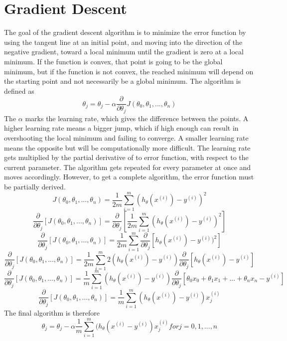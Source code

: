 \documentclass[a4paper,12pt]{article}
\begin{document}
\section{Gradient Descent}
The goal of the gradient descent algorithm is to minimize the error function by using the tangent line at an initial point, and moving into the direction of the negative gradient, toward a local minimum until the gradient is zero at a local minimum. If the function is convex, that point is going to be the global minimum, but if the function is not convex, the reached minimum will depend on the starting point and not necessarily be a global minimum. The algorithm is defined as \[\theta_j = \theta_j - \alpha \frac{\partial}{\partial\theta_j} J(\theta_0, \theta_1, ..., \theta_n)\] The \(\alpha\) marks the learning rate, which gives the difference between the points. A higher learning rate means a bigger jump, which if high enough can result in overshooting the local minimum and failing to converge. A smaller learning rate means the opposite but will be computationally more difficult. The learning rate gets multiplied by the partial derivative of to error function, with respect to the current parameter. The algorithm gets repeated for every parameter at once and moves accordingly. However, to get a complete algorithm, the error function must be partially derived. 
\[J(\theta_0, \theta_1, ..., \theta_n) = \frac{1}{2m} \sum_{i=1}^m (h_\theta(x^{(i)}) - y^{(i)})^2\]
\[\frac{\partial}{\partial\theta_j} [J(\theta_0, \theta_1, ..., \theta_n)] = \frac{\partial}{\partial\theta_j} [\frac{1}{2m} \sum_{i=1}^m (h_\theta(x^{(i)}) - y^{(i)})^2]\]
\[\frac{\partial}{\partial\theta_j} [J(\theta_0, \theta_1, ..., \theta_n)] = \frac{1}{2m} \sum_{i=1}^m \frac{\partial}{\partial\theta_j} [h_\theta(x^{(i)}) - y^{(i)})^2]\]
\[\frac{\partial}{\partial\theta_j} [J(\theta_0, \theta_1, ..., \theta_n)] = \frac{1}{2m} \sum_{i=1}^m 2(h_\theta(x^{(i)}) - y^{(i)}) \frac{\partial}{\partial\theta_j}[h_\theta(x^{(i)}) - y^{(i)}]\]
\[\frac{\partial}{\partial\theta_j} [J(\theta_0, \theta_1, ..., \theta_n)] = \frac{1}{m} \sum_{i=1}^m (h_\theta(x^{(i)}) - y^{(i)})\frac{\partial}{\partial\theta_j} [\theta_0x_0+\theta_1x_1+...+\theta_nx_n-y^{(i)}]\]
\[\frac{\partial}{\partial\theta_j} [J(\theta_0, \theta_1, ..., \theta_n)] = \frac{1}{m} \sum_{i=1}^m (h_\theta(x^{(i)}) - y^{(i)})x_j^{(i)}\]
The final algorithm is therefore
\[\theta_j = \theta_j - \alpha \frac{1}{m} \sum_{i=1}^m (h_\theta(x^{(i)} - y^{(i)})x_j^{(i)} for j = 0,1,...,n\]
\end{document}
